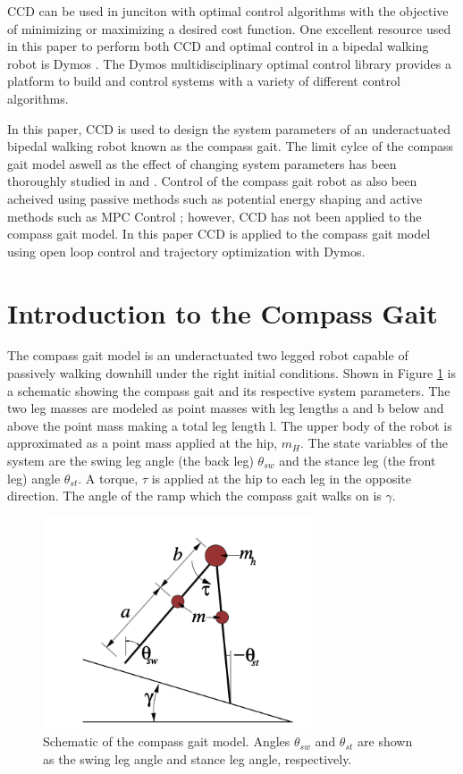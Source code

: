 \documentclass{./springer/svjour3}
\begin{document}
CCD can be used in junciton with optimal control algorithms with the objective of minimizing or maximizing a desired cost function. One 
excellent resource used in this paper to perform both CCD and optimal control in a bipedal walking robot is Dymos \cite{Falck2021}. The Dymos multidisciplinary optimal control library
provides a platform to build and control systems with a variety of different control algorithms.

%
In this paper, CCD is used to design the system parameters of an underactuated bipedal walking robot known as the compass gait. The limit cylce
of the compass gait model aswell as the effect of changing system parameters has been thoroughly studied 
in \cite{Goswami} and \cite{goswami:inria-00073701}. Control of the compass gait robot as also been acheived using passive methods such as potential energy shaping
\cite{Spong} and active methods such as MPC Control \cite{Kamath2009}; however, CCD has not been applied to the compass gait model.
In this paper CCD is applied to the compass gait model using open loop control and trajectory optimization with Dymos.

\section{Introduction to the Compass Gait}
The compass gait model is an underactuated two legged robot capable of passively walking downhill under the right initial conditions.
Shown in Figure \ref{fig:compassgaitmodel} is a schematic showing the compass gait and its respective system parameters. The two leg masses are modeled as
point masses with leg lengths a and b below and above the point mass making a total leg length l. The upper body of the robot is approximated as a point mass
applied at the hip, $m_H$. The state variables of the system are the swing leg angle (the back leg) $\theta_{sw}$ and the stance leg (the front leg) angle
$\theta_{st}$. A torque, $\tau$ is applied at the hip to each leg in the opposite direction. The angle of the ramp which the compass gait walks on is $\gamma$.

\begin{figure}[!h]
\centering
\includegraphics[width=8cm]{./figures/compassgaitmodel.png}
\caption{Schematic of the compass gait model. Angles $\theta_{sw}$ and $\theta_{st}$ are shown as the swing leg angle and stance leg angle, respectively.}
\label{fig:compassgaitmodel}
\end{figure}
\end{document}
